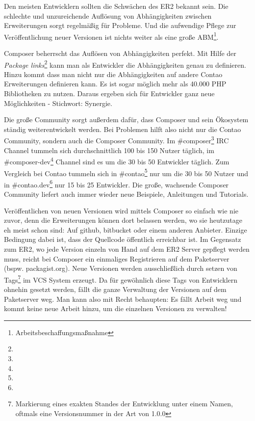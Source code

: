 \documentclass[
paper=a4,
draft=false,%
fontsize=10pt%
]{scrartcl}
\begin{document}
Den meisten Entwicklern sollten die Schwächen des ER2 bekannt sein. Die schlechte und unzureichende Auflösung von Abhängigkeiten zwischen Erweiterungen sorgt regelmäßig für Probleme. Und die aufwendige Pflege zur Veröffentlichung neuer Versionen ist nichts weiter als eine große ABM\footnote{Arbeitsbeschaffungsmaßnahme}.

Composer beherrscht das Auflösen von Abhängigkeiten perfekt. Mit Hilfe der \textit{Package links}\footnote{} kann man als Entwickler die Abhängigkeiten genau zu definieren. Hinzu kommt dass man nicht nur die Abhängigkeiten auf andere Contao Erweiterungen definieren kann. Es ist sogar möglich mehr als 40.000 PHP Bibliotheken zu nutzen. Daraus ergeben sich für Entwickler ganz neue Möglichkeiten - Stichwort: Synergie.

Die große Community sorgt außerdem dafür, dass Composer und sein Ökosystem ständig weiterentwickelt werden. Bei Problemen hilft also nicht nur die Contao Community, sondern auch die Composer Community. Im \#composer\footnote{} IRC Channel tummeln sich durchschnittlich 100 bis 150 Nutzer täglich, im \#composer-dev\footnote{} Channel sind es um die 30 bis 50 Entwickler täglich. Zum Vergleich bei Contao tummeln sich in \#contao\footnote{} nur um die 30 bis 50 Nutzer und in \#contao.dev\footnote{} nur 15 bis 25 Entwickler. Die große, wachsende Composer Community liefert auch immer wieder neue  Beispiele, Anleitungen und Tutorials.

Veröffentlichen von neuen Versionen wird mittels Composer so einfach wie nie zuvor, denn die Erweiterungen können dort belassen werden, wo sie heutzutage eh meist schon sind: Auf github, bitbucket oder einem anderen Anbieter. Einzige Bedingung dabei ist, dass der Quellcode öffentlich erreichbar ist. Im Gegensatz zum ER2, wo jede Version einzeln von Hand auf dem ER2 Server gepflegt werden muss, reicht bei Composer ein einmaliges Registrieren auf dem Paketserver (bspw. packagist.org). Neue Versionen werden ausschließlich durch setzen von Tags\footnote{Markierung eines exakten Standes der Entwicklung unter einem Namen, oftmals eine Versionsnummer in der Art von 1.0.0} im VCS System erzeugt. Da für gewöhnlich diese Tags von Entwicklern ohnehin gesetzt werden, fällt die ganze Verwaltung der Versionen auf dem Paketserver weg. Man kann also mit Recht behaupten: Es fällt Arbeit weg und kommt keine neue Arbeit hinzu, um die einzelnen Versionen zu verwalten!
\end{document}
